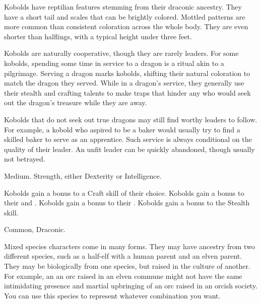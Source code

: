 
  Kobolds have reptilian features stemming from their draconic ancestry.
  They have a short tail and scales that can be brightly colored.
  Mottled patterns are more common than consistent coloration across the whole body.
  They are even shorter than halflings, with a typical height under three feet.

  Kobolds are naturally cooperative, though they are rarely leaders.
  For some kobolds, spending some time in service to a dragon is a ritual akin to a pilgrimage.
  Serving a dragon marks kobolds, shifting their natural coloration to match the dragon they served.
  While in a dragon's service, they generally use their stealth and crafting talents to make traps that hinder any who would seek out the dragon's treasure while they are away.

  Kobolds that do not seek out true dragons may still find worthy leaders to follow.
  For example, a kobold who aspired to be a baker would usually try to find a skilled baker to serve as an apprentice.
  Such service is always conditional on the quality of their leader.
  An unfit leader can be quickly abandoned, though usually not betrayed.

   Medium.
    Strength, either  Dexterity or  Intelligence.
  \begin{raggeditemize}
     Kobolds gain a  bonus to a Craft skill of their choice.
     Kobolds gain a  bonus to their  and .
     Kobolds gain a  bonus to their .
     Kobolds gain a  bonus to the Stealth skill.
  \end{raggeditemize}
   Common, Draconic.


  Mixed species characters come in many forms.
  They may have ancestry from two different species, such as a half-elf with a human parent and an elven parent.
  They may be biologically from one species, but raised in the culture of another.
  For example, an an orc raised in an elven commune might not have the same intimidating presence and martial upbringing of an orc raised in an orcish society.
  You can use this species to represent whatever combination you want.

